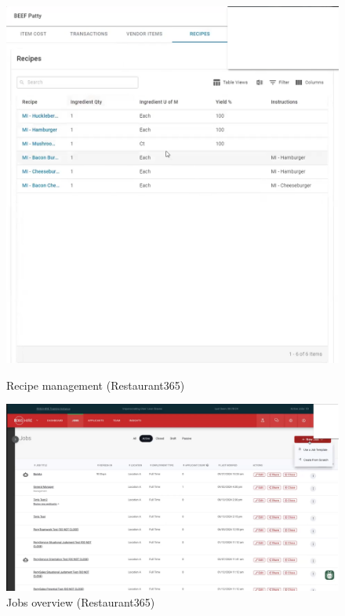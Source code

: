 \documentclass[]{VUMIFTemplateClass}
\begin{document}
\begin{figure}[h]
    \centering
    \begin{minipage}{0.48\textwidth}
        \centering
        \includegraphics[width=\textwidth]{images/examples/item_recipes_r365.png}
        \caption{Recipe management (Restaurant365)}
    \end{minipage}
    \hfill
    \begin{minipage}{0.48\textwidth}
        \centering
        \includegraphics[width=\textwidth]{images/examples/jobs_r365.png}
        \caption{Jobs overview (Restaurant365)}
    \end{minipage}
\end{figure}
\end{document}
